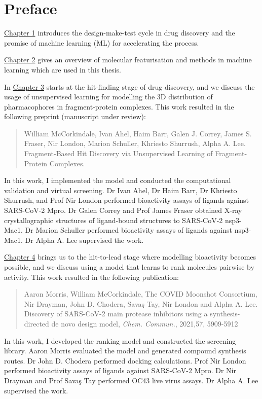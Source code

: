 \chapter*{Preface}
\hyperref[ch:intro]{Chapter 1} introduces the design-make-test cycle in drug discovery and the promise of machine learning (ML) for accelerating the process.

\hyperref[ch:background]{Chapter 2} gives an overview of molecular featurisation and methods in machine learning which are used in this thesis.

In \hyperref[ch:fresco]{Chapter 3} starts at the hit-finding stage of drug discovery, and we discuss the usage of unsupervised learning for modelling the 3D distribution of pharmacophores in fragment-protein complexes. This work resulted in the following preprint (manuscript under review):
\begin{quote}
William McCorkindale, Ivan Ahel, Haim Barr, Galen J. Correy, James S. Fraser, Nir London, Marion Schuller, Khriesto Shurrush, Alpha A. Lee. Fragment-Based Hit Discovery via Unsupervised Learning of Fragment-Protein Complexes.
\end{quote}
In this work, I implemented the model and conducted the computational validation and virtual screening. Dr Ivan Ahel, Dr Haim Barr, Dr Khriesto Shurrush, and Prof Nir London performed bioactivity assays of ligands against SARS-CoV-2 Mpro. Dr Galen Correy and Prof James Fraser obtained X-ray crystallographic structures of ligand-bound structures to SARS-CoV-2 nsp3-Mac1. Dr Marion Schuller performed bioactivity assays of ligands against nsp3-Mac1. Dr Alpha A. Lee supervised the work.

\hyperref[ch:ranking]{Chapter 4} brings us to the hit-to-lead stage where modelling bioactivity becomes possible, and we discuss using a model that learns to rank molecules pairwise by activity. This work resulted in the following publication:
\begin{quote}
Aaron Morris, William McCorkindale, The COVID Moonshot Consortium, Nir Drayman, John D. Chodera, Savaş Tay, Nir London and Alpha A. Lee. Discovery of SARS-CoV-2 main protease inhibitors using a synthesis-directed de novo design model, \textit{Chem. Commun.}, 2021,57, 5909-5912 
\end{quote}
In this work, I developed the ranking model and constructed the screening library. Aaron Morris evaluated the model and generated compound synthesis routes. Dr John D. Chodera performed docking calculations. Prof Nir London performed bioactivity assays of ligands against SARS-CoV-2 Mpro. Dr Nir Drayman and Prof Savaş Tay performed OC43 live virus assays.  Dr Alpha A. Lee supervised the work.

